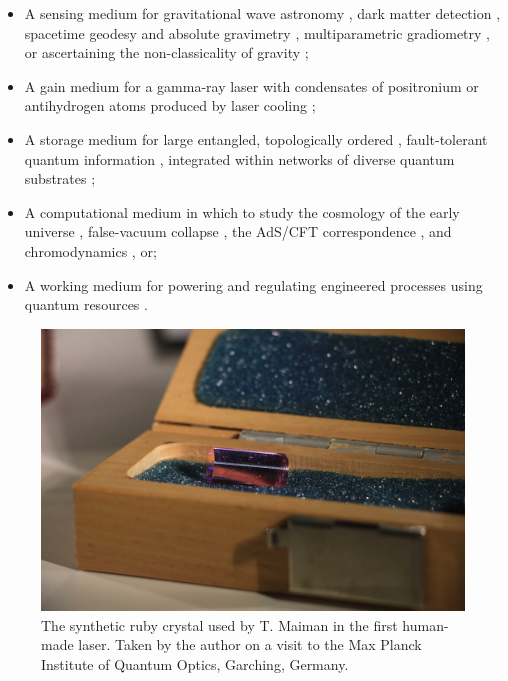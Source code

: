	\begin{itemize}
	 \item A sensing medium for gravitational wave astronomy \cite{Kolkowitz16}, dark matter detection \cite{Derevianko14}, spacetime geodesy and absolute gravimetry \cite{Bidel20}, multiparametric gradiometry \cite{Hardman16}, or ascertaining the non-classicality of gravity \cite{Howl21};
	 \item A gain medium for a gamma-ray laser with condensates of positronium  \cite{Wang14} or antihydrogen atoms produced by laser cooling \cite{Baker21};
	 \item A storage medium \cite{Heller20} for large entangled, topologically ordered \cite{Zhang19}, fault-tolerant quantum information \cite{Briegel99}, integrated within networks of diverse quantum substrates \cite{Maring17};
	 \item A computational medium in which to study the cosmology of the early universe \cite{Fischer04}, false-vacuum collapse \cite{Ng21}, the AdS/CFT correspondence \cite{Wei21}, and chromodynamics \cite{Zohar15}, or;
	 \item A working medium \cite{Niedenzu19} for powering and regulating engineered processes using quantum resources \cite{Chitambar19}.
	\end{itemize}
	

	\begin{figure}
	\includegraphics[width=\textwidth]{fig/conclusion/maiman_ruby}
	\caption*{The synthetic ruby crystal used by T. Maiman in the first human-made laser. Taken by the author on a visit to the Max Planck Institute of Quantum Optics, Garching, Germany.}
	\end{figure}

